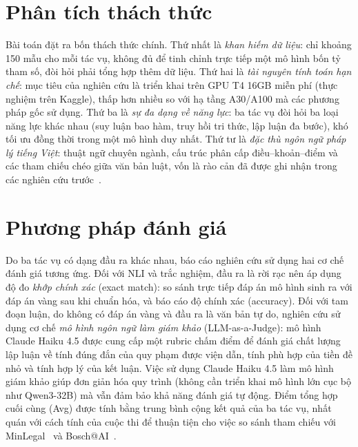 \section{Phân tích thách thức}

Bài toán đặt ra bốn thách thức chính. Thứ nhất là \emph{khan hiếm dữ liệu}: chỉ khoảng 150 mẫu cho mỗi tác vụ, không đủ để tinh chỉnh trực tiếp một mô hình bốn tỷ tham số, đòi hỏi phải tổng hợp thêm dữ liệu. Thứ hai là \emph{tài nguyên tính toán hạn chế}: mục tiêu của nghiên cứu là triển khai trên GPU T4 16GB miễn phí (thực nghiệm trên Kaggle), thấp hơn nhiều so với hạ tầng A30/A100 mà các phương pháp gốc sử dụng. Thứ ba là \emph{sự đa dạng về năng lực}: ba tác vụ đòi hỏi ba loại năng lực khác nhau (suy luận bao hàm, truy hồi tri thức, lập luận đa bước), khó tối ưu đồng thời trong một mô hình duy nhất. Thứ tư là \emph{đặc thù ngôn ngữ pháp lý tiếng Việt}: thuật ngữ chuyên ngành, cấu trúc phân cấp điều--khoản--điểm và các tham chiếu chéo giữa văn bản luật, vốn là rào cản đã được ghi nhận trong các nghiên cứu trước~\cite{nguyen2025vlqa, ha2024vibidlqa}.

\section{Phương pháp đánh giá}

Do ba tác vụ có dạng đầu ra khác nhau, báo cáo nghiên cứu sử dụng hai cơ chế đánh giá tương ứng. Đối với NLI và trắc nghiệm, đầu ra là rời rạc nên áp dụng độ đo \emph{khớp chính xác} (exact match): so sánh trực tiếp đáp án mô hình sinh ra với đáp án vàng sau khi chuẩn hóa, và báo cáo độ chính xác (accuracy). Đối với tam đoạn luận, do không có đáp án vàng và đầu ra là văn bản tự do, nghiên cứu sử dụng cơ chế \emph{mô hình ngôn ngữ làm giám khảo} (LLM-as-a-Judge): mô hình Claude Haiku 4.5 được cung cấp một rubric chấm điểm để đánh giá chất lượng lập luận về tính đúng đắn của quy phạm được viện dẫn, tính phù hợp của tiền đề nhỏ và tính hợp lý của kết luận. Việc sử dụng Claude Haiku 4.5 làm mô hình giám khảo giúp đơn giản hóa quy trình (không cần triển khai mô hình lớn cục bộ như Qwen3-32B) mà vẫn đảm bảo khả năng đánh giá tự động. Điểm tổng hợp cuối cùng (Avg) được tính bằng trung bình cộng kết quả của ba tác vụ, nhất quán với cách tính của cuộc thi để thuận tiện cho việc so sánh tham chiếu với MinLegal~\cite{luan2025minlegal} và Bosch@AI~\cite{quang2025bosch}.
